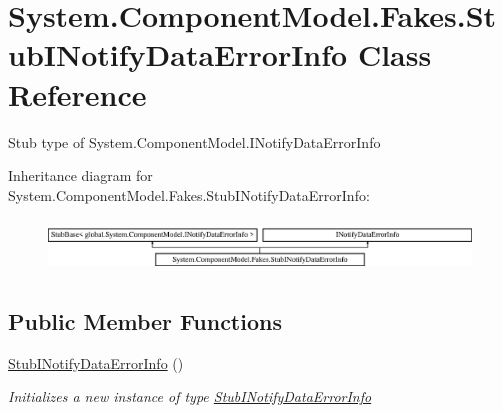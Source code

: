\hypertarget{class_system_1_1_component_model_1_1_fakes_1_1_stub_i_notify_data_error_info}{\section{System.\-Component\-Model.\-Fakes.\-Stub\-I\-Notify\-Data\-Error\-Info Class Reference}
\label{class_system_1_1_component_model_1_1_fakes_1_1_stub_i_notify_data_error_info}
}


Stub type of System.\-Component\-Model.\-I\-Notify\-Data\-Error\-Info 


Inheritance diagram for System.\-Component\-Model.\-Fakes.\-Stub\-I\-Notify\-Data\-Error\-Info\-:\begin{figure}[H]
\begin{center}
\leavevmode
\includegraphics[height=1.421320cm]{class_system_1_1_component_model_1_1_fakes_1_1_stub_i_notify_data_error_info}
\end{center}
\end{figure}
\subsection*{Public Member Functions}
\begin{DoxyCompactItemize}
\item 
\hyperlink{class_system_1_1_component_model_1_1_fakes_1_1_stub_i_notify_data_error_info_a4e350c4ea32e8211141c89886f4e8315}{Stub\-I\-Notify\-Data\-Error\-Info} ()
\begin{DoxyCompactList}\small\item\em Initializes a new instance of type \hyperlink{class_system_1_1_component_model_1_1_fakes_1_1_stub_i_notify_data_error_info}{Stub\-I\-Notify\-Data\-Error\-Info}\end{DoxyCompactList}\end{DoxyCompactItemize}
